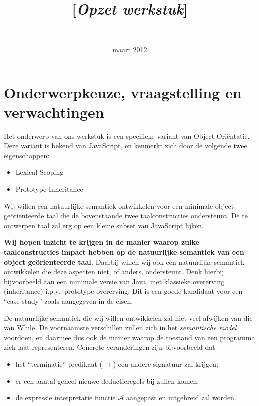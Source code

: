 \documentclass[a4paper,11pt]{article}
\title{\Title \\ {\Large [\textit{Opzet werkstuk}]}}
\author{\Kelley \\ \Tim}
\date{maart 2012}
\begin{document}
\maketitle
\thispagestyle{fancy}

\section*{Onderwerpkeuze, vraagstelling en verwachtingen}

Het onderwerp van ons werkstuk is een specifieke variant van Object Ori\"entatie. Deze variant is bekend van JavaScript, en kenmerkt zich door de volgende twee eigenschappen:

\begin{itemize}
	\item Lexical Scoping
	\item Prototype Inheritance
\end{itemize}

Wij willen een natuurlijke semantiek ontwikkelen voor een minimale object-ge\"orienteerde taal die de bovenstaande twee taalconstructies ondersteunt. De te ontwerpen taal zal erg op een kleine subset van JavaScript lijken.

\textbf{Wij hopen inzicht te krijgen in de manier waarop zulke taalconstructies impact hebben op de natuurlijke semantiek van een object ge\"orienteerde taal.} Daarbij willen wij ook een natuurlijke semantiek ontwikkelen die deze aspecten niet, of anders, ondersteunt. Denk hierbij bijvoorbeeld aan een minimale versie van Java, met klassieke overerving (inheritance) i.p.v.~prototype overerving. Dit is een goede kandidaat voor een ``case study'' zoals aangegeven in de eisen.

De natuurlijke semantiek die wij willen ontwikkelen zal niet veel afwijken van die van While. De voornaamste verschillen zullen zich in het \emph{semantische model} voordoen, en daarmee dus ook de manier waarop de toestand van een programma zich laat representeren. Concrete veranderingen zijn bijvoorbeeld dat

\begin{itemize}
	\item het ``terminatie'' predikaat ($\longrightarrow$) een andere signatuur zal krijgen;
	\item er een aantal geheel nieuwe deductieregels bij zullen komen;
	\item de expressie interpretatie functie $\mathcal{A}$ aangepast en uitgebreid zal worden.
\end{itemize}
\end{document}
